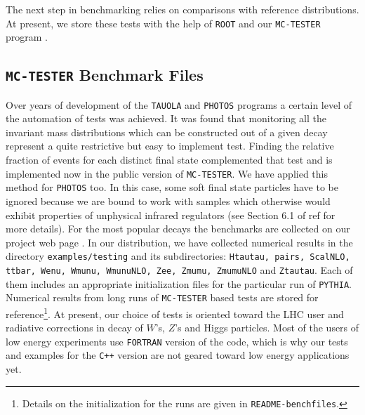 \documentclass[]{Photos_interface_design}
\begin{document}
The next step in benchmarking relies on comparisons with reference distributions. 
At present, we store these tests with the help of {\tt ROOT} \cite{Antcheva:2009zz} and our {\tt MC-TESTER} program \cite{Davidson:2008ma}.



\subsection{{\tt MC-TESTER} Benchmark Files}



Over years of development of the {\tt TAUOLA} and {\tt PHOTOS} programs a certain level 
of the automation of tests was achieved. It was found that monitoring all the invariant mass distributions which can be constructed out of a given decay represent 
a quite restrictive but easy to implement test.
Finding the relative fraction of events for each distinct final state 
 complemented that test and is implemented now in the public version of {\tt MC-TESTER}. 
We have applied this method 
for {\tt PHOTOS} too. In this case, some soft final state particles have to be ignored because we are bound to  work with  samples which otherwise would
exhibit properties of unphysical infrared regulators (see Section 6.1 of 
ref \cite{Davidson:2008ma} for more details). For the most popular 
decays the benchmarks are collected on our project web page \cite{Photos_tests}.
In our distribution, we have collected numerical results in the directory
{\tt examples/testing} and its subdirectories:  
{\tt Htautau, pairs, ScalNLO, ttbar, Wenu, Wmunu, WmunuNLO, Zee, Zmumu, 
ZmumuNLO} and {\tt Ztautau}. Each of them includes
an appropriate initialization files for the particular run of {\tt PYTHIA}. Numerical results from long runs of {\tt MC-TESTER} based tests
are stored for reference\footnote{Details on the initialization for the 
runs are given in 
{\tt README-benchfiles}.}. At present, our choice of tests is oriented toward 
the LHC user and radiative corrections in decay of $W$'s, $Z$'s and Higgs particles.
Most of the users of low energy experiments use  {\tt FORTRAN} version 
of the code, which is why our tests and examples for the {\tt C++} version are not geared toward 
low energy applications yet.
\end{document}
